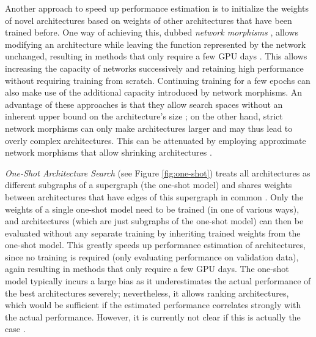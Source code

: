 \documentclass[twoside,11pt]{article}
\renewcommand{\cite}[1]{\citep{#1}}
\newcommand{\crc}[1]{#1}
\begin{document}
Another approach to speed up performance estimation is to initialize the weights of novel architectures based on weights of other architectures that have been trained before. One way of achieving this, dubbed \emph{network morphisms} \citep{DBLP:journals/corr/WeiWRC16}, allows modifying an architecture while leaving the function represented by the network unchanged, 
resulting in methods \crc{that only require a few GPU days} \cite{elsken_simple_2017,cai2017reinforcement, cai_path-level_2018,jin2018efficient}. This allows increasing the capacity of networks successively and retaining high performance without requiring training from scratch. Continuing training for a few epochs can also make use of the additional capacity introduced by network morphisms. An advantage of these approaches is that they allow search spaces without an inherent upper bound on the architecture's size \cite{elsken_simple_2017}; on the other hand, strict network morphisms can only make architectures larger and may thus lead to overly complex architectures. This can be attenuated by employing approximate network morphisms that allow shrinking architectures \cite{elsken_multi_2018}. 

\emph{One-Shot Architecture Search} (see Figure \ref{fig:one-shot}) treats all architectures as different subgraphs of a supergraph (the one-shot model) and shares weights between architectures that have edges of this supergraph in common \cite{DBLP:journals/corr/SaxenaV16, DBLP:journals/corr/abs-1708-05344, pham_enas_2018,liu_darts,bender_icml:2018,cai2018proxylessnas,xie2018snas}. Only the weights of a single one-shot model need to be trained (in one of various ways), and architectures (which are just subgraphs of the one-shot model) can then be evaluated without any separate training by inheriting trained weights from the one-shot model. This greatly speeds up performance estimation of architectures, since no training is required (only evaluating performance on validation data)\crc{, again resulting in methods that only require a few GPU days}. The one-shot model typically incurs a large bias as it underestimates the actual performance of the best architectures severely; nevertheless, it allows ranking architectures, which would be sufficient if the estimated performance correlates strongly with the actual performance. However, it is currently not clear if this is actually the case \cite{bender_icml:2018, sciuto_evalnas}.
\end{document}
